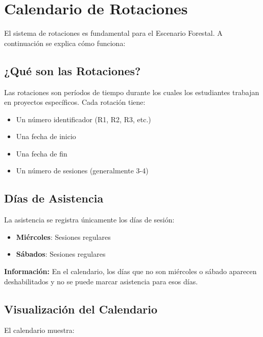 \documentclass[11pt,a4paper]{article}
\begin{document}
\section{Calendario de Rotaciones}

El sistema de rotaciones es fundamental para el Escenario Forestal. A continuación se explica cómo funciona:

\subsection{¿Qué son las Rotaciones?}

Las rotaciones son períodos de tiempo durante los cuales los estudiantes trabajan en proyectos específicos. Cada rotación tiene:

\begin{itemize}
  \item Un número identificador (R1, R2, R3, etc.)
  \item Una fecha de inicio
  \item Una fecha de fin
  \item Un número de sesiones (generalmente 3-4)
\end{itemize}

\subsection{Días de Asistencia}

La asistencia se registra únicamente los días de sesión:

\begin{itemize}
  \item \textbf{Miércoles}: Sesiones regulares
  \item \textbf{Sábados}: Sesiones regulares
\end{itemize}

\begin{infobox}
\textbf{Información:} En el calendario, los días que no son miércoles o sábado aparecen deshabilitados y no se puede marcar asistencia para esos días.
\end{infobox}

\subsection{Visualización del Calendario}

El calendario muestra:
\end{document}

